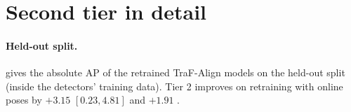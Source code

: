 \begin{table}[h]
  \centering
  \caption{\textbf{Interpolated reference with three gap limits} (released TraF-Align boxes, \apseven, 95\% intervals). Placeholder runs are re-registered only if they are at most 1\,s or 3\,s long, or always.}
  \label{tab:auxinterp}
  \small
  \setlength{\tabcolsep}{4pt}
\end{table}

\begin{table}[h]
  \centering
  \caption{\textbf{Label-median reference by population} (\apseven differences, mean over three heads; every 95\% interval excludes zero). On placeholder messages (zero) \method is now better than the online pose as well, because the reference registers the roadside-only objects.}
  \label{tab:auxfull}
  \small
  \setlength{\tabcolsep}{3pt}
\end{table}

\section{Second tier in detail}
\label{app:tier2}

\paragraph{Held-out split.}
 gives the absolute AP of the retrained TraF-Align models on the held-out split (inside the detectors' training data). Tier 2 improves on retraining with online poses by $+3.15$ \apseven $[0.23, 4.81]$ and $+1.91$ \apfive.

